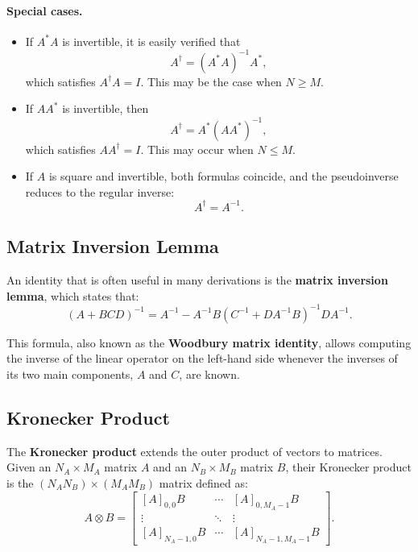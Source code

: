 \paragraph{Special cases.}
\begin{itemize}
  \item If \(A^{*}A\) is invertible, it is easily verified that
  \begin{equation}
  A^{\dagger} = (A^{*}A)^{-1}A^{*},
  \tag{B.32}
  \end{equation}
  which satisfies \(A^{\dagger}A = I\).  
  This may be the case when \(N \ge M\).

  \item If \(A A^{*}\) is invertible, then
  \begin{equation}
  A^{\dagger} = A^{*}(A A^{*})^{-1},
  \tag{B.33}
  \end{equation}
  which satisfies \(A A^{\dagger} = I\).  
  This may occur when \(N \le M\).

  \item If \(A\) is square and invertible, both formulas coincide, and the pseudoinverse reduces to the regular inverse:
  \[
  A^{\dagger} = A^{-1}.
  \]
\end{itemize}

\subsection{Matrix Inversion Lemma}

An identity that is often useful in many derivations is the \textbf{matrix inversion lemma}, which states that:
\begin{equation}
(A + B C D)^{-1}
= A^{-1} - A^{-1} B \left(C^{-1} + D A^{-1} B \right)^{-1} D A^{-1}.
\tag{B.34}
\end{equation}

This formula, also known as the \textbf{Woodbury matrix identity}, allows computing the inverse of the linear operator on the left-hand side whenever the inverses of its two main components, \(A\) and \(C\), are known.


\subsection{Kronecker Product}

The \textbf{Kronecker product} extends the outer product of vectors to matrices.  
Given an \( N_A \times M_A \) matrix \(A\) and an \( N_B \times M_B \) matrix \(B\), their Kronecker product is the \( (N_A N_B) \times (M_A M_B) \) matrix defined as:
\begin{equation}
A \otimes B =
\begin{bmatrix}
[A]_{0,0} B & \cdots & [A]_{0,M_A-1} B \\
\vdots & \ddots & \vdots \\
[A]_{N_A-1,0} B & \cdots & [A]_{N_A-1,M_A-1} B
\end{bmatrix}.
\tag{B.35}
\end{equation}

